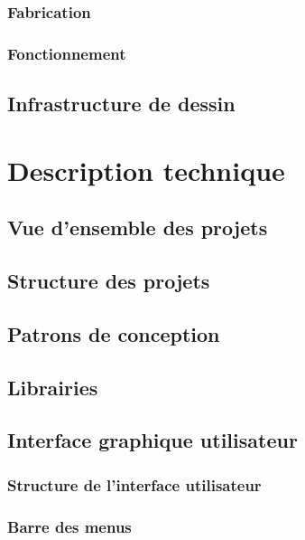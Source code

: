 \documentclass[11pt,a4paper,oldfontcommands]{memoir}
\begin{document}
\subsection{Fabrication}

\subsection{Fonctionnement}

\section{Infrastructure de dessin}


\chapter{Description technique}

\section{Vue d'ensemble des projets}

\section{Structure des projets}

\section{Patrons de conception}

\section{Librairies}

\section{Interface graphique utilisateur}

\subsection{Structure de l'interface utilisateur}

\subsection{Barre des menus}
\end{document}
